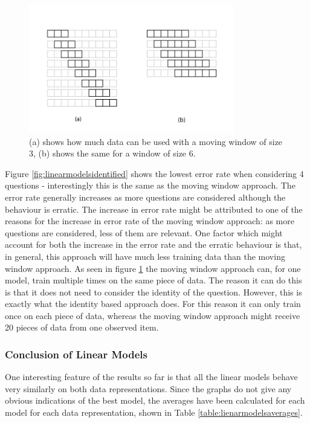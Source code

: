 \begin{figure}[h!]
\centering
\includegraphics[width=0.8\textwidth]{images/movingwindowdata.png}
\caption{(a) shows how much data can be used with a moving window of size 3, (b) shows the same for a window of size 6.}
\label{fig:movingwindowdata}
\end{figure}

Figure \ref{fig:linearmodelsidentified} shows the lowest error rate when considering 4 questions - interestingly this is the same as the moving window approach. The error rate generally increases as more questions are considered although the behaviour is erratic.
The increase in error rate might be attributed to one of the reasons for the increase in error rate of the moving window approach: as more questions are considered, less of them are relevant.
One factor which might account for both the increase in the error rate and the erratic behaviour is that, in general, this approach will have much less training data than the moving window approach.
As seen in figure \ref{fig:movingwindowdata} the moving window approach can, for one model, train multiple times on the same piece of data. The reason it can do this is that it does not need to consider the identity of the question. However, this is exactly what the identity based approach does. For this reason it can only train once on each piece of data, whereas the moving window approach might receive 20 pieces of data from one observed item.

\subsubsection{Conclusion of Linear Models}
One interesting feature of the results so far is that all the linear models behave very similarly on both data representations. Since the graphs do not give any obvious indications of the best model, the averages have been calculated for each model for each data representation, shown in Table \ref{table:lienarmodelsaverages}.

